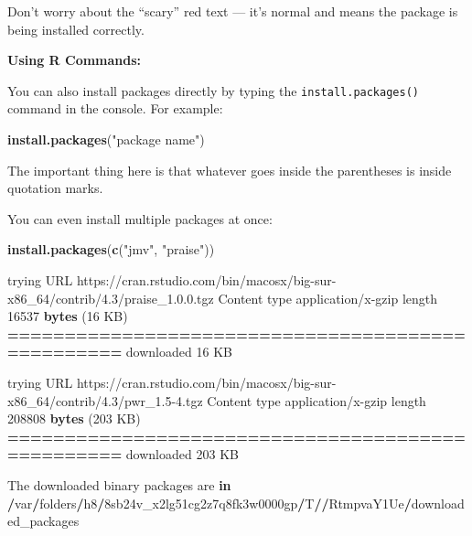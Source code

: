 \documentclass[
]{book}
\newenvironment{Shaded}{\begin{snugshade}}{\end{snugshade}}
\newcommand{\ControlFlowTok}[1]{\textcolor[rgb]{0.13,0.29,0.53}{\textbf{#1}}}
\newcommand{\DecValTok}[1]{\textcolor[rgb]{0.00,0.00,0.81}{#1}}
\newcommand{\ErrorTok}[1]{\textcolor[rgb]{0.64,0.00,0.00}{\textbf{#1}}}
\newcommand{\FunctionTok}[1]{\textcolor[rgb]{0.13,0.29,0.53}{\textbf{#1}}}
\newcommand{\NormalTok}[1]{#1}
\newcommand{\SpecialCharTok}[1]{\textcolor[rgb]{0.81,0.36,0.00}{\textbf{#1}}}
\newcommand{\StringTok}[1]{\textcolor[rgb]{0.31,0.60,0.02}{#1}}
\begin{document}
Don't worry about the ``scary'' red text --- it's normal and means the package is being installed correctly.

\textbf{Using R Commands:}

You can also install packages directly by typing the \texttt{install.packages()} command in the console. For example:

\begin{Shaded}
\begin{Highlighting}[]
\FunctionTok{install.packages}\NormalTok{(}\StringTok{"package name"}\NormalTok{)}
\end{Highlighting}
\end{Shaded}

The important thing here is that whatever goes inside the parentheses is inside quotation marks.

You can even install multiple packages at once:

\begin{Shaded}
\begin{Highlighting}[]
\FunctionTok{install.packages}\NormalTok{(}\FunctionTok{c}\NormalTok{(}\StringTok{"jmv"}\NormalTok{, }\StringTok{"praise"}\NormalTok{))}


\NormalTok{trying URL }\StringTok{\textquotesingle{}https://cran.rstudio.com/bin/macosx/big{-}sur{-}x86\_64/contrib/4.3/praise\_1.0.0.tgz\textquotesingle{}}
\NormalTok{Content type }\StringTok{\textquotesingle{}application/x{-}gzip\textquotesingle{}}\NormalTok{ length }\DecValTok{16537} \FunctionTok{bytes}\NormalTok{ (}\DecValTok{16}\NormalTok{ KB)}
\SpecialCharTok{==}\ErrorTok{================================================}
\NormalTok{downloaded }\DecValTok{16}\NormalTok{ KB}

\NormalTok{trying URL }\StringTok{\textquotesingle{}https://cran.rstudio.com/bin/macosx/big{-}sur{-}x86\_64/contrib/4.3/pwr\_1.5{-}4.tgz\textquotesingle{}}
\NormalTok{Content type }\StringTok{\textquotesingle{}application/x{-}gzip\textquotesingle{}}\NormalTok{ length }\DecValTok{208808} \FunctionTok{bytes}\NormalTok{ (}\DecValTok{203}\NormalTok{ KB)}
\SpecialCharTok{==}\ErrorTok{================================================}
\NormalTok{downloaded }\DecValTok{203}\NormalTok{ KB}


\NormalTok{The downloaded binary packages are }\ControlFlowTok{in}
    \SpecialCharTok{/}\NormalTok{var}\SpecialCharTok{/}\NormalTok{folders}\SpecialCharTok{/}\NormalTok{h8}\SpecialCharTok{/}\DecValTok{8}\NormalTok{sb24v\_x2lg51cg2z7q8fk3w0000gp}\SpecialCharTok{/}\NormalTok{T}\SpecialCharTok{/}\ErrorTok{/}\NormalTok{RtmpvaY1Ue}\SpecialCharTok{/}\NormalTok{downloaded\_packages}
\end{Highlighting}
\end{Shaded}
\end{document}
